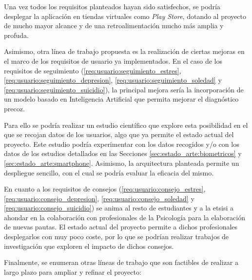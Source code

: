     Una vez todos los requisitos planteados hayan sido satisfechos, se podría desplegar la aplicación en tiendas virtuales como \textit{Play Store}, dotando al proyecto de mucho mayor alcance y de una retroalimentación mucho más amplia y profuda.
    
    Asimismo, otra línea de trabajo propuesta es la realización de ciertas mejoras en el marco de los requisitos de usuario ya implementados. En el caso de los requisitos de seguimiento (\ref{req:usuario:seguimiento_estres}, \ref{req:usuario:seguimiento_depresion}, \ref{req:usuario:seguimiento_soledad} y \ref{req:usuario:seguimiento_suicidio}), la principal mejora sería la incorporación de un modelo basado en Inteligencia Artificial que permita mejorar el diagnóstico precoz. 
    
    Para ello se podría realizar un estudio científico que explore esta posibilidad en el que se recojan datos de los usuarios, algo que ya permite el estado actual del proyecto. Este estudio podría experimentar con los datos recogidos y/o con los datos de los estudios detallados en las Secciones \ref{sec:estado_arte:biometricos} y \ref{sec:estado_arte:smartphone}. Asimismo, la arquitectura planteada permite un despliegue sencillo, con el cual se podría evaluar la eficacia del mismo.

    En cuanto a los requisitos de consejos (\ref{req:usuario:consejo_estres}, \ref{req:usuario:consejo_depresion}, \ref{req:usuario:consejo_soledad} y \ref{req:usuario:consejo_suicidio}) se anima al resto de estudiantes y a la \gls{etsisi} a ahondar en la colaboración con profesionales de la Psicología para la elaboración de nuevas pautas. El estado actual del proyecto permite a dichos profesionales desplegarlos con muy poco coste, por lo que se podrían realizar trabajos de investigación que exploren el impacto de dichos consejos.

    Finalmente, se enumeran otras líneas de trabajo que son factibles de realizar a largo
    plazo para ampliar y refinar el proyecto:
    
